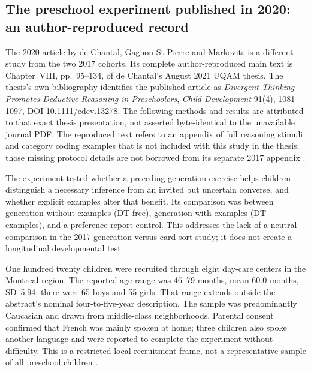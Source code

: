 \subsection{The preschool experiment published in 2020: an author-reproduced record}
\label{sec:p19-r151-2020-author-record}

The 2020 article by de Chantal, Gagnon-St-Pierre and Markovits is a different
study from the two 2017 cohorts. Its complete author-reproduced main text is
Chapter~VIII, pp.~95--134, of de Chantal's August 2021 UQAM thesis.
The thesis's own bibliography identifies the published article as
\emph{Divergent Thinking Promotes Deductive Reasoning in Preschoolers},
\emph{Child Development} 91(4), 1081--1097, DOI 10.1111/cdev.13278.
The following methods and results are attributed to that exact thesis
presentation, not asserted byte-identical to the unavailable journal PDF.
The reproduced text refers to an appendix of full reasoning stimuli and
category coding examples that is not included with this study in the thesis;
those missing protocol details are not borrowed from its separate 2017 appendix
\cite[pp.~92--134,151]{DeChantal2021ThesisSelectedStudy}.

The experiment tested whether a preceding generation exercise helps children
distinguish a necessary inference from an invited but uncertain converse,
and whether explicit examples alter that benefit. Its comparison was between
generation without examples (DT-free), generation with examples (DT-examples),
and a preference-report control. This addresses the lack of a neutral
comparison in the 2017 generation-versus-card-sort study; it does not create
a longitudinal developmental test.

One hundred twenty children were recruited through eight day-care centers
in the Montreal region. The reported age range was 46--79 months, mean
60.0 months, SD~5.94; there were 65 boys and 55 girls. That range extends
outside the abstract's nominal four-to-five-year description. The sample
was predominantly Caucasian and drawn from middle-class neighborhoods.
Parental consent confirmed that French was mainly spoken at home; three
children also spoke another language and were reported to complete the
experiment without difficulty. This is a restricted local recruitment frame,
not a representative sample of all preschool children
\cite[pp.~107--112]{DeChantal2021ThesisSelectedStudy}.

